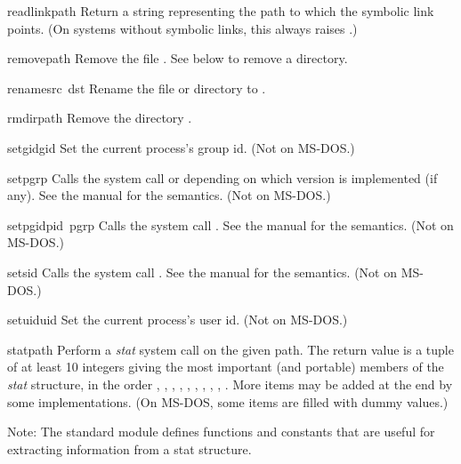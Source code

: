 \begin{funcdesc}{readlink}{path}
Return a string representing the path to which the symbolic link
points.  (On systems without symbolic links, this always raises
.)
\end{funcdesc}

\begin{funcdesc}{remove}{path}
Remove the file .  See  below to remove a directory.
\end{funcdesc}

\begin{funcdesc}{rename}{src\, dst}
Rename the file or directory  to .
\end{funcdesc}

\begin{funcdesc}{rmdir}{path}
Remove the directory .
\end{funcdesc}

\begin{funcdesc}{setgid}{gid}
Set the current process's group id.
(Not on MS-DOS.)
\end{funcdesc}

\begin{funcdesc}{setpgrp}{}
Calls the system call  or 
depending on which version is implemented (if any).  See the \UNIX{}
manual for the semantics.
(Not on MS-DOS.)
\end{funcdesc}

\begin{funcdesc}{setpgid}{pid\, pgrp}
Calls the system call .  See the \UNIX{} manual for
the semantics.
(Not on MS-DOS.)
\end{funcdesc}

\begin{funcdesc}{setsid}{}
Calls the system call .  See the \UNIX{} manual for the
semantics.
(Not on MS-DOS.)
\end{funcdesc}

\begin{funcdesc}{setuid}{uid}
Set the current process's user id.
(Not on MS-DOS.)
\end{funcdesc}

\begin{funcdesc}{stat}{path}
Perform a {\em stat} system call on the given path.  The return value
is a tuple of at least 10 integers giving the most important (and
portable) members of the {\em stat} structure, in the order
,
,
,
,
,
,
,
,
,
.
More items may be added at the end by some implementations.
(On MS-DOS, some items are filled with dummy values.)

Note: The standard module  defines functions and constants
that are useful for extracting information from a stat structure.
\end{funcdesc}

